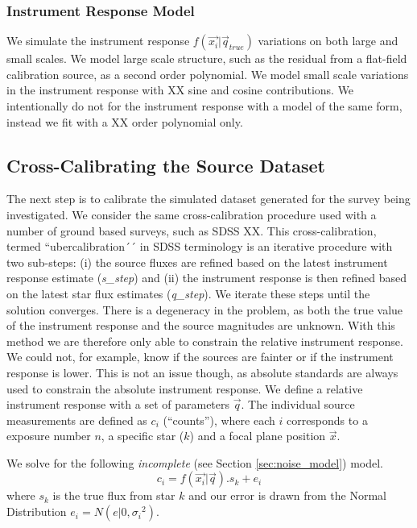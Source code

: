 \documentclass[manuscript]{aastex}
\begin{document}
\subsubsection{Instrument Response Model}
We simulate the instrument response $f(\vec{x_i} | \vec{q}_{true})$ variations on both large and small scales. We model large scale structure, such as the residual from a flat-field calibration source, as a second order polynomial. We model small scale variations in the instrument response with XX sine and cosine contributions. We intentionally do not for the instrument response with a model of the same form, instead we fit with a XX order polynomial only. 

\subsection{Cross-Calibrating the Source Dataset}
The next step is to calibrate the simulated dataset generated for the survey being investigated. We consider the same cross-calibration procedure used with a number of ground based surveys, such as SDSS XX. This cross-calibration, termed ``ubercalibration´´ in SDSS terminology is an iterative procedure with two sub-steps: (i) the source fluxes are refined based on the latest instrument response estimate (\textit{s\_step}) and (ii) the instrument response is then refined based on the latest star flux estimates (\textit{q\_step}). We iterate these steps until the solution converges. There is a degeneracy in the problem, as both the true value of the instrument response and the source magnitudes are unknown. With this method we are therefore only able to constrain the relative instrument response. We could not, for example, know if the sources are fainter or if the instrument response is lower. This is not an issue though, as absolute standards are always used to constrain the absolute instrument response. We define a relative instrument response with a set of parameters $\vec{q}$. The individual source measurements are defined as $c_i$ (``counts''), where each $i$ corresponds to a exposure number $n$, a specific star ($k$) and a focal plane position $\vec{x}$.

\noindent{}We solve for the following \textit{incomplete} (see Section \ref{sec:noise_model}) model.
\begin{displaymath}
c_i = f(\vec{x_i} | \vec{q}) . s_{k} + e_{i}
\end{displaymath}
where $s_k$ is the true flux from star $k$ and our error is drawn from the Normal Distribution $e_{i} = N(e|0,{\sigma_i}^2)$.
\end{document}
